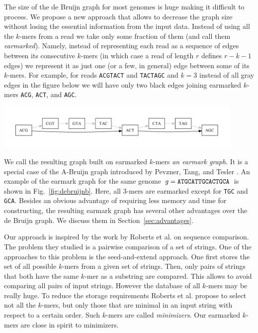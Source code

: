 \documentclass[12pt]{article}
\begin{document}
The size of the de Bruijn graph for most genomes is huge making
it difficult to process. 
We propose a new approach that allows to decrease
the graph size without losing the essential information from the input data.
Instead of using all the $k$-mers from a read we take only some fraction of them
(and call them \emph{earmarked}).
Namely, instead 
of representing each read as a sequence of edges 
between its consecutive $k$-mers (in which case a read of length $r$ defines
$r-k-1$ edges) we represent it as just one (or a few, in general)
edge between some of its $k$-mers. For example, for 
reads {\tt ACGTACT} and {\tt TACTAGC} and $k=3$
instead of all gray edges in the figure below we will have 
only two black edges joining earmarked $k$-mers {\tt ACG}, {\tt ACT}, and {\tt AGC}.
\begin{center}
\includegraphics[width=0.9\textwidth]{fig1.pdf}
\end{center}
We call the resulting graph built on earmarked $k$-mers \emph{an earmark graph}.
It is a special case of the A-Bruijn graph introduced by Pevzner, Tang, and Tesler 
\cite{PTG04}.
An example of the earmark graph for the same genome $g={\tt ATGCATTGCACTGCA}$ 
is shown in Fig.~\ref{fig:debruijnb}.
Here, all $3$-mers are earmarked except for {\tt TGC} and {\tt GCA}.
Besides an obvious advantage of requiring less memory 
and time for constructing, the resulting earmark graph has several other advantages over the
de Bruijn graph. We discuss them 
in Section~\ref{sec:advantages}.

Our approach is inspired by the work by Roberts et al. \cite{RW04} on sequence comparison.
The problem they studied is a pairwise comparison of a set of strings. 
One of the approaches to this problem is the seed-and-extend approach.
One first stores the set of all possible $k$-mers from a given set of strings.
Then, only pairs of strings that both have the same $k$-mer as a substring are compared.
This allows to avoid comparing all pairs of input strings. However the database
of all $k$-mers may be really huge. To reduce the storage requirements Roberts et al. propose
to select not all the $k$-mers, but only those that are minimal in an input string with respect
to a certain order. Such $k$-mers are called \emph{minimizers}. Our earmarked $k$-mers are close in spirit 
to minimizers.
\end{document}

